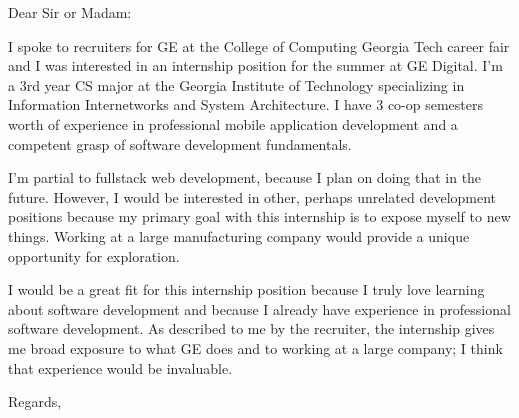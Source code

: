 \documentclass{letter}
\begin{document}
\begin{letter}{}
\opening{Dear Sir or Madam:}

I spoke to recruiters for GE at the College of Computing Georgia Tech career fair and I was interested in an internship position for the summer at GE Digital. I'm a 3rd year CS major at the Georgia Institute of Technology specializing in Information Internetworks and System Architecture. I have 3 co-op semesters worth of experience in professional mobile application development and a competent grasp of software development fundamentals. 

I'm partial to fullstack web development, because I plan on doing that in the future. However, I would be interested in other, perhaps unrelated development positions because my primary goal with this internship is to expose myself to new things. Working at a large manufacturing company would provide a unique opportunity for exploration.

I would be a great fit for this internship position because I truly love learning about software development and because I already have experience in professional software development. As described to me by the recruiter, the internship gives me broad exposure to what GE does and to working at a large company; I think that experience would be invaluable.




\closing{Regards,}
\end{letter}
\end{document}

